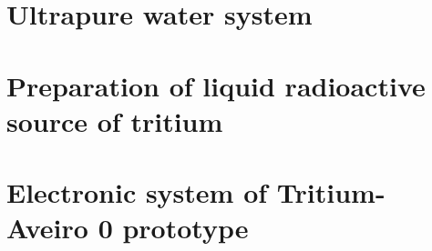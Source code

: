 \documentclass[12pt,a4paper]{book}
\begin{document}
\chapter{Ultrapure water system}\label{App:UltraPureWaterSystem}


\chapter{Preparation of liquid radioactive source of tritium}\label{App:TritiumSourcePreparation}


\chapter{Electronic system of Tritium-Aveiro 0 prototype}\label{App:ElectronicSystemAveiro}



\end{document}

